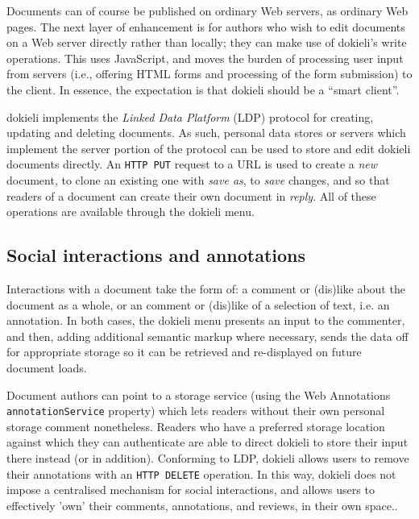 \documentclass[a4paper]{llncs}
\begin{document}
\par Documents can of course be published on ordinary Web servers, as ordinary Web pages. The next layer of enhancement is for authors who wish to edit documents on a Web server directly rather than locally; they can make use of dokieli’s write operations. This uses JavaScript, and moves the burden of processing user input from servers (i.e., offering HTML forms and processing of the form submission) to the client.  In essence, the expectation is that dokieli should be a ``smart client''.
                                    
                                    
\par dokieli implements the \textit{Linked Data Platform} (LDP) protocol for creating, updating and deleting documents. As such, personal data stores or servers which implement the server portion of the protocol can be used to store and edit dokieli documents directly. An {\tt HTTP PUT} request to a URL is used to create a \textit{new} document, to clone an existing one with \textit{save as}, to \textit{save} changes, and so that readers of a document can create their own document in \textit{reply}. All of these operations are available through the dokieli menu.
                                
                            

                            
                                \subsection{Social interactions and annotations}
  \label{social-interactions-and-annotations}

                                
                                    
\par Interactions with a document take the form of: a comment or (dis)like about the document as a whole, or an comment or (dis)like of a selection of text, i.e. an annotation. In both cases, the dokieli menu presents an input to the commenter, and then, adding additional semantic markup where necessary, sends the data off for appropriate storage so it can be retrieved and re-displayed on future document loads.

                                    
\par Document authors can point to a storage service (using the Web Annotations {\tt annotationService} property) which lets readers without their own personal storage comment nonetheless. Readers who have a preferred storage location against which they can authenticate are able to direct dokieli to store their input there instead (or in addition). Conforming to LDP, dokieli allows users to remove their annotations with an {\tt HTTP DELETE} operation. In this way, dokieli does not impose a centralised mechanism for social interactions, and allows users to effectively 'own' their comments, annotations, and reviews, in their own space..
\end{document}
